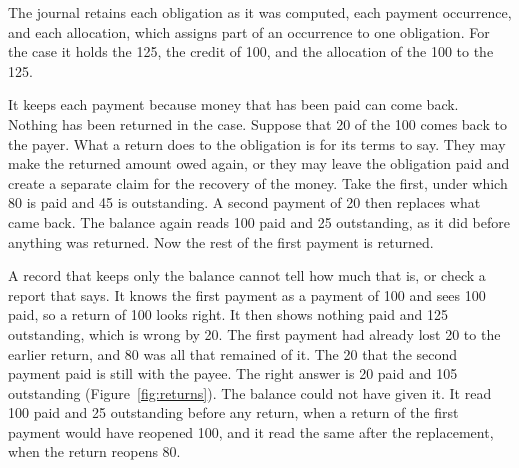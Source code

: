 \documentclass{momentum}
\begin{document}
The journal retains each obligation as it was computed, each payment occurrence, and each allocation, which assigns part of an occurrence to one obligation. For the case it holds the 125, the credit of 100, and the allocation of the 100 to the 125.

It keeps each payment because money that has been paid can come back. Nothing has been returned in the case. Suppose that 20 of the 100 comes back to the payer. What a return does to the obligation is for its terms to say. They may make the returned amount owed again, or they may leave the obligation paid and create a separate claim for the recovery of the money. Take the first, under which 80 is paid and 45 is outstanding. A second payment of 20 then replaces what came back. The balance again reads 100 paid and 25 outstanding, as it did before anything was returned. Now the rest of the first payment is returned.

A record that keeps only the balance cannot tell how much that is, or check a report that says. It knows the first payment as a payment of 100 and sees 100 paid, so a return of 100 looks right. It then shows nothing paid and 125 outstanding, which is wrong by 20. The first payment had already lost 20 to the earlier return, and 80 was all that remained of it. The 20 that the second payment paid is still with the payee. The right answer is 20 paid and 105 outstanding (Figure~\ref{fig:returns}). The balance could not have given it. It read 100 paid and 25 outstanding before any return, when a return of the first payment would have reopened 100, and it read the same after the replacement, when the return reopens 80.
\end{document}
